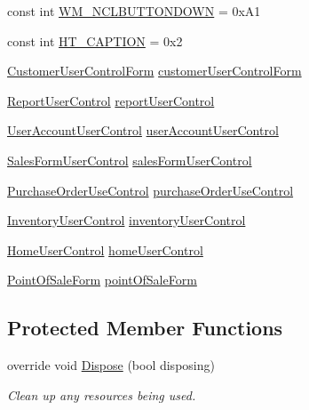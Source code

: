 \begin{DoxyCompactItemize}
\item 
const int \hyperlink{class_health___assignment_1_1_main_menu_aff7f3166a02dc0c98dff7ba94aca4a26}{W\+M\+\_\+\+N\+C\+L\+B\+U\+T\+T\+O\+N\+D\+O\+WN} = 0x\+A1
\item 
const int \hyperlink{class_health___assignment_1_1_main_menu_a1681a483b795427be179d6775bbda1e4}{H\+T\+\_\+\+C\+A\+P\+T\+I\+ON} = 0x2
\item 
\hyperlink{class_health___assignment_1_1_customer_user_control_form}{Customer\+User\+Control\+Form} \hyperlink{class_health___assignment_1_1_main_menu_a3a330cc89d5299efda46613fe1f2b5a2}{customer\+User\+Control\+Form}
\item 
\hyperlink{class_health___assignment_1_1_report_user_control}{Report\+User\+Control} \hyperlink{class_health___assignment_1_1_main_menu_aa258806647f2ddd2e1b3464439ebc282}{report\+User\+Control}
\item 
\hyperlink{class_health___assignment_1_1_user_account_user_control}{User\+Account\+User\+Control} \hyperlink{class_health___assignment_1_1_main_menu_a0ce1c8e5ea202d2d9d841df0401f4ef5}{user\+Account\+User\+Control}
\item 
\hyperlink{class_health___assignment_1_1_sales_form_user_control}{Sales\+Form\+User\+Control} \hyperlink{class_health___assignment_1_1_main_menu_af42d33aa63ec8674bb7cb5c8d30317da}{sales\+Form\+User\+Control}
\item 
\hyperlink{class_health___assignment_1_1_purchase_order_use_control}{Purchase\+Order\+Use\+Control} \hyperlink{class_health___assignment_1_1_main_menu_acaad5b66eba817e90aadc1b5909bdb01}{purchase\+Order\+Use\+Control}
\item 
\hyperlink{class_health___assignment_1_1_inventory_user_control}{Inventory\+User\+Control} \hyperlink{class_health___assignment_1_1_main_menu_afb1b731bdf2e266c0e787a7d5ed644b5}{inventory\+User\+Control}
\item 
\hyperlink{class_health___assignment_1_1_home_user_control}{Home\+User\+Control} \hyperlink{class_health___assignment_1_1_main_menu_a01e7af15baebe8c2d5716dba938348f7}{home\+User\+Control}
\item 
\hyperlink{class_health___assignment_1_1_point_of_sale_form}{Point\+Of\+Sale\+Form} \hyperlink{class_health___assignment_1_1_main_menu_af40912f2d169574421c4bd5d7a75d1dd}{point\+Of\+Sale\+Form}
\end{DoxyCompactItemize}
\subsection*{Protected Member Functions}
\begin{DoxyCompactItemize}
\item 
override void \hyperlink{class_health___assignment_1_1_main_menu_aaac10c296be97d7564893c586e409867}{Dispose} (bool disposing)
\begin{DoxyCompactList}\small\item\em Clean up any resources being used. \end{DoxyCompactList}\end{DoxyCompactItemize}


